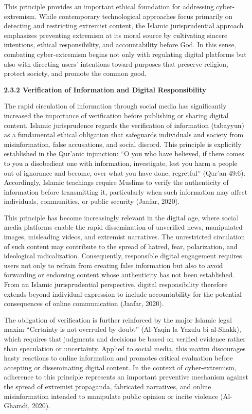 \documentclass[11pt,a4paper]{article}
\begin{document}
	This principle provides an important ethical foundation for addressing cyber-extremism. While contemporary technological approaches focus primarily on detecting and restricting extremist content, the Islamic jurisprudential approach emphasizes preventing extremism at its moral source by cultivating sincere intentions, ethical responsibility, and accountability before God. In this sense, combating cyber-extremism begins not only with regulating digital platforms but also with directing users' intentions toward purposes that preserve religion, protect society, and promote the common good.
	
	\textbf{2.3.2 Verification of Information and Digital Responsibility}
	
	The rapid circulation of information through social media has significantly increased the importance of verification before publishing or sharing digital content. Islamic jurisprudence regards the verification of information (tabayyun) as a fundamental ethical obligation that safeguards individuals and society from misinformation, false accusations, and social discord. This principle is explicitly established in the Qur'anic injunction: ``O you who have believed, if there comes to you a disobedient one with information, investigate, lest you harm a people out of ignorance and become, over what you have done, regretful'' (Qur'an 49:6). Accordingly, Islamic teachings require Muslims to verify the authenticity of information before transmitting it, particularly when such information may affect individuals, communities, or public security (Jaafar, 2020).
	
	This principle has become increasingly relevant in the digital age, where social media platforms enable the rapid dissemination of unverified news, manipulated images, misleading videos, and extremist narratives. The unrestricted circulation of such content may contribute to the spread of hatred, fear, polarization, and ideological radicalization. Consequently, responsible digital engagement requires users not only to refrain from creating false information but also to avoid forwarding or endorsing content whose authenticity has not been established. From an Islamic jurisprudential perspective, digital responsibility therefore extends beyond individual expression to include accountability for the potential consequences of online communication (Jaafar, 2020).
	
	The obligation of verification is further reinforced by the major Islamic legal maxim ``Certainty is not overruled by doubt'' (Al-Yaqin la Yazulu bi al-Shakk), which requires that judgments and decisions be based on verified evidence rather than speculation or uncertainty. Applied to social media, this maxim discourages hasty reactions to online information and promotes critical evaluation before accepting or disseminating digital content. In the context of cyber-extremism, adherence to this principle represents an important preventive mechanism against the spread of extremist propaganda, fabricated narratives, and online misinformation intended to manipulate public opinion or incite violence (Al-Ghamdi, 2020).
	
\end{document}
